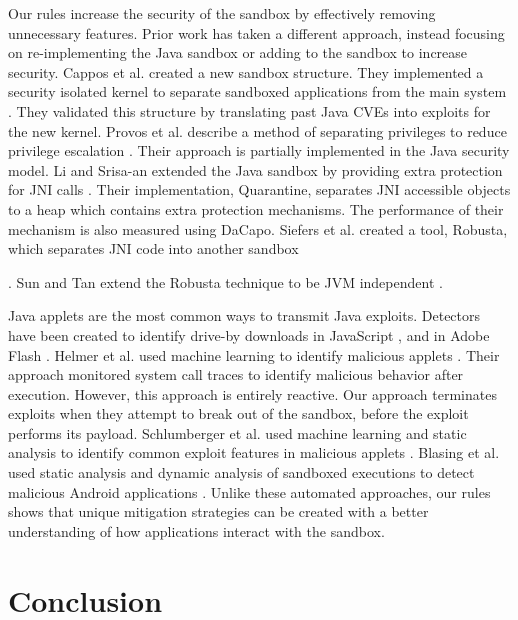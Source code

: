 \documentclass{sig-alternate}
\begin{document}
Our rules increase the security of the sandbox
by effectively removing unnecessary features. Prior work has taken a different
approach, instead focusing on re-implementing the Java sandbox or
adding to the sandbox to increase security. Cappos et al. created
a new sandbox structure. They implemented a security isolated kernel
to separate sandboxed applications from the main system \cite{cappos_retaining_2010}.
They validated this structure by translating past Java CVEs into exploits
for the new kernel. Provos et al. describe a method of separating
privileges to reduce privilege escalation \cite{Provos-PrivilegeEscalation}.
Their approach is partially implemented in the Java security model.
Li and Srisa-an extended the Java sandbox by providing extra protection
for JNI calls \cite{li_quarantine:_2011}. Their implementation, Quarantine,
separates JNI accessible objects to a heap which contains extra protection
mechanisms. The performance of their mechanism is also measured using
DaCapo. Siefers et al. created a tool, Robusta, which separates JNI
code into another sandbox \cite{siefers_robusta:_2010}%

. Sun and Tan extend the Robusta technique to be JVM independent \cite{sun_jvm-portable_2012}. 

Java applets are the most common ways to transmit Java exploits. Detectors
have been created to identify drive-by downloads in JavaScript \cite{cova_detection_2010},
and in Adobe Flash \cite{ford_analyzing_2009}. Helmer et al. used
machine learning to identify malicious applets \cite{helmer_anomalous_2001}.
Their approach monitored system call traces to identify malicious
behavior after execution. However, this approach is entirely reactive.
Our approach terminates exploits when they attempt to break out of
the sandbox, before the exploit performs its payload. Schlumberger
et al. used machine learning and static analysis to identify common
exploit features in malicious applets \cite{schlumberger_jarhead_2012}.
Blasing et al. used static analysis and dynamic analysis of sandboxed
executions to detect malicious Android applications \cite{Blasing-AndriodSandbox}.
Unlike these automated approaches, our rules shows that unique
mitigation strategies can be created with a better understanding of
how applications interact with the sandbox. 


\section{Conclusion}
\end{document}
